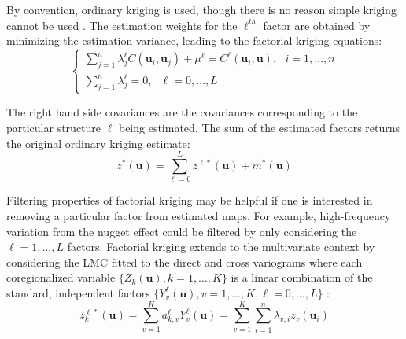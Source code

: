 By convention, ordinary kriging is used, though there is no reason simple kriging cannot be used \citep{hong2007improved}. The estimation weights for the $\ell^{th}$ factor are obtained by minimizing the estimation variance, leading to the factorial kriging equations:
\begin{equation*}
    \begin{cases}
        \sum_{j=1}^{n} \lambda_{j}^{\ell} C(\mathbf{u}_{i}, \mathbf{u}_{j}) + \mu^{\ell} = C^{\ell}(\mathbf{u}_{i}, \mathbf{u}), \ \ \ i=1,\dots,n \\
        \sum_{j=1}^{n} \lambda_{j}^{\ell} = 0, \ \ \ \ell = 0,\dots,L
    \end{cases}
\end{equation*}

The right hand side covariances are the covariances corresponding to the particular structure $\ell$ being estimated. The sum of the estimated factors returns the original ordinary kriging estimate:
\begin{equation*}
    z^{*}(\mathbf{u}) = \sum_{\ell=0}^{L} z^{\ell*}(\mathbf{u}) + m^{*}(\mathbf{u})
\end{equation*}

Filtering properties of factorial kriging may be helpful if one is interested in removing a particular factor from estimated maps. For example, high-frequency variation from the nugget effect could be filtered by only considering the $\ell=1,\dots,L$ factors. Factorial kriging extends to the multivariate context by considering the LMC fitted to the direct and cross variograms where each coregionalized variable $\{Z_{k}(\mathbf{u}), k=1,\dots,K\}$ is a linear combination of the standard, independent factors $\{Y_{v}^{\ell}(\mathbf{u}), v=1,\dots,K; \ell=0,\dots,L\}$ \citep{wackernagel1988geostatistical}:
\begin{equation*}
    z^{\ell*}_{k}(\mathbf{u}) = \sum_{v=1}^{K} a_{k,v}^{\ell} Y^{\ell}_{v}(\mathbf{u}) = \sum_{v=1}^{K}\sum_{i=1}^{n} \lambda_{v,i} z_{v}(\mathbf{u}_{i})
\end{equation*}


